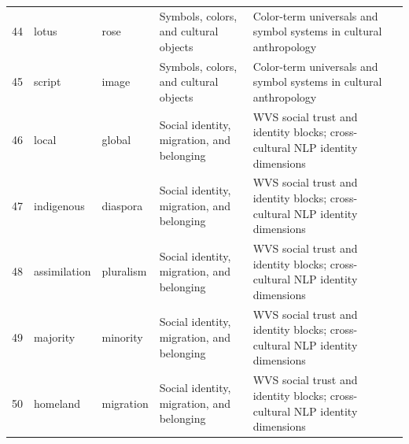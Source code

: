 \begin{tabular}{@{}rlllll@{}}
44 & lotus & rose & Symbols, colors, and cultural objects & Color-term universals and symbol systems in cultural anthropology & \cite{hershcovich2022challenges} \\
45 & script & image & Symbols, colors, and cultural objects & Color-term universals and symbol systems in cultural anthropology & \cite{arora2023probing} \\
46 & local & global & Social identity, migration, and belonging & WVS social trust and identity blocks; cross-cultural NLP identity dimensions & \cite{inglehart2005modernization} \\
47 & indigenous & diaspora & Social identity, migration, and belonging & WVS social trust and identity blocks; cross-cultural NLP identity dimensions & \cite{hershcovich2022challenges} \\
48 & assimilation & pluralism & Social identity, migration, and belonging & WVS social trust and identity blocks; cross-cultural NLP identity dimensions & \cite{hershcovich2022challenges} \\
49 & majority & minority & Social identity, migration, and belonging & WVS social trust and identity blocks; cross-cultural NLP identity dimensions & \cite{arora2023probing} \\
50 & homeland & migration & Social identity, migration, and belonging & WVS social trust and identity blocks; cross-cultural NLP identity dimensions & \cite{inglehart2005modernization} \\
\bottomrule
\end{tabular}
